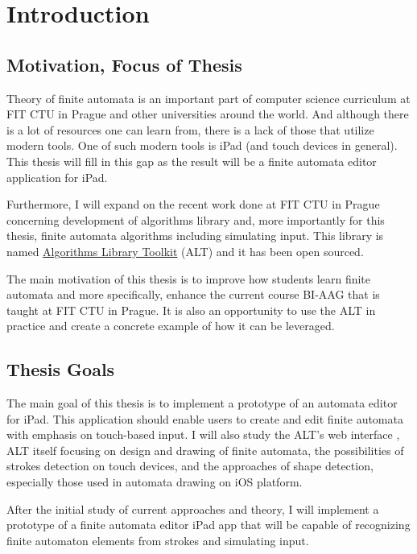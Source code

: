 \chapter{Introduction}
\setcounter{page}{1}

\section{Motivation, Focus of Thesis}

Theory of finite automata is an important part of computer science curriculum at FIT CTU in Prague and other universities around the world. And although there is a lot of resources one can learn from, there is a lack of those that utilize modern tools. One of such modern tools is iPad (and touch devices in general). This thesis will fill in this gap as the result will be a finite automata editor application for iPad.

Furthermore, I will expand on the recent work done at FIT CTU in Prague concerning development of algorithms library and, more importantly for this thesis, finite automata algorithms including simulating input. This library is named \href{https://alt.fit.cvut.cz/}{Algorithms Library Toolkit} (ALT) \cite{alt} and it has been open sourced.

The main motivation of this thesis is to improve how students learn finite automata and more specifically, enhance the current course BI-AAG that is taught at FIT CTU in Prague. It is also an opportunity to use the ALT in practice and create a concrete example of how it can be leveraged.

\section{Thesis Goals}

The main goal of this thesis is to implement a prototype of an automata editor for iPad. This application should enable users to create and edit finite automata with emphasis on touch-based input.
I will also study the ALT's web interface \cite{state-maker} \cite{web-alt}, ALT itself focusing on design and drawing of finite automata, the possibilities of strokes detection on touch devices, and the approaches of shape detection, especially those used in automata drawing on iOS platform.

After the initial study of current approaches and theory, I will implement a prototype of a finite automata editor iPad app that will be capable of recognizing finite automaton elements from strokes and simulating input.

